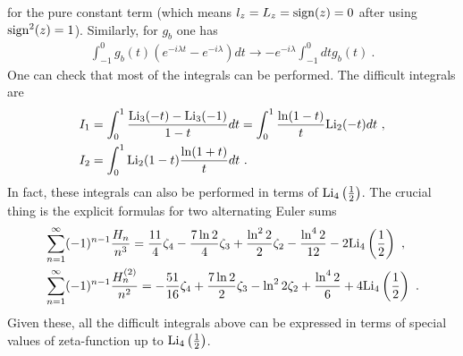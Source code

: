 \documentclass[a4paper,11pt]{article}
\begin{document}
for the pure constant term (which means $l_z=L_z={\rm sign}(z)=0$ after using ${\rm sign}^2(z)=1$).
Similarly, for $g_b$ one has
\begin{align}
\int_{-1}^0 g_b(t)\left(e^{-i\lambda t}-e^{-i\lambda}\right)dt\rightarrow -e^{-i\lambda }\int_{-1}^{0} dt g_b(t) \ .
\end{align}
One can check that most of the integrals can be performed. The difficult integrals are
\begin{align}
&I_1=\int_{0}^1\frac{{\rm Li}_3(-t)-{\rm Li}_3(-1)}{1-t}dt=\int_{0}^{1}\frac{\ln(1-t)}{t}{\rm Li}_2(-t) dt \ , \\
&I_2=\int_{0}^1{\rm Li}_2(1-t)\frac{\ln(1+t)}{t}dt \  .
\end{align}
In fact, these integrals can also be performed in terms of ${\rm Li}_4\left(\frac{1}{2}\right)$. The crucial thing is the explicit formulas for two alternating Euler sums~\cite{valean_nahin_2019}
\begin{align}
&\sum_{n=1}^{\infty}(-1)^{n-1}\frac{H_n}{n^3}=\frac{11}{4}\zeta_4-\frac{7\ln 2}{4} \zeta_3+\frac{\ln^2 2}{2}\zeta_2-\frac{\ln^4 2}{12} -2{\rm Li}_4\left(\frac{1}{2}\right) \ , \\
&\sum_{n=1}^{\infty}(-1)^{n-1}\frac{H_n^{(2)}}{n^2}=-\frac{51}{16}\zeta_4+\frac{7\ln 2}{2} \zeta_3-\ln^2 2 \zeta_2+\frac{\ln^4 2}{6} +4{\rm Li}_4\left(\frac{1}{2}\right) \ .
\end{align}
Given these, all the difficult integrals above can be expressed in terms of special values of zeta-function up to ${\rm Li}_4\left(\frac{1}{2}\right)$.
\end{document}
